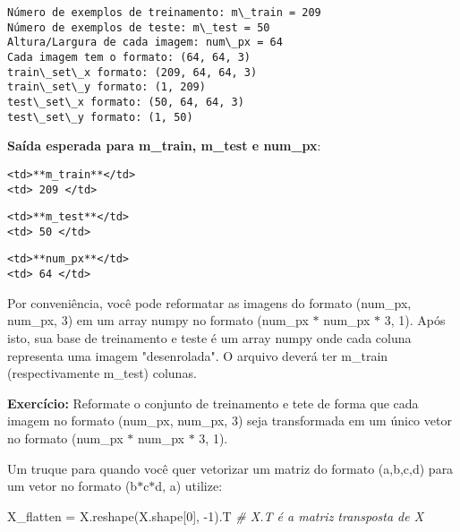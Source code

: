 \documentclass[11pt]{article}
\newenvironment{Shaded}{}{}
\newcommand{\DecValTok}[1]{\textcolor[rgb]{0.25,0.63,0.44}{{#1}}}
\newcommand{\CommentTok}[1]{\textcolor[rgb]{0.38,0.63,0.69}{\textit{{#1}}}}
\newcommand{\NormalTok}[1]{{#1}}
\newcommand{\OperatorTok}[1]{\textcolor[rgb]{0.40,0.40,0.40}{{#1}}}
\begin{document}
    \begin{Verbatim}[commandchars=\\\{\}]
Número de exemplos de treinamento: m\_train = 209
Número de exemplos de teste: m\_test = 50
Altura/Largura de cada imagem: num\_px = 64
Cada imagem tem o formato: (64, 64, 3)
train\_set\_x formato: (209, 64, 64, 3)
train\_set\_y formato: (1, 209)
test\_set\_x formato: (50, 64, 64, 3)
test\_set\_y formato: (1, 50)

    \end{Verbatim}

    \textbf{Saída esperada para m\_train, m\_test e num\_px}:

\begin{verbatim}
<td>**m_train**</td>
<td> 209 </td> 
\end{verbatim}

\begin{verbatim}
<td>**m_test**</td>
<td> 50 </td> 
\end{verbatim}

\begin{verbatim}
<td>**num_px**</td>
<td> 64 </td> 
\end{verbatim}

    Por conveniência, você pode reformatar as imagens do formato (num\_px,
num\_px, 3) em um array numpy no formato (num\_px \(*\) num\_px \(*\) 3,
1). Após isto, sua base de treinamento e teste é um array numpy onde
cada coluna representa uma imagem "desenrolada". O arquivo deverá ter
m\_train (respectivamente m\_test) colunas.

\textbf{Exercício:} Reformate o conjunto de treinamento e tete de forma
que cada imagem no formato (num\_px, num\_px, 3) seja transformada em um
único vetor no formato (num\_px \(*\) num\_px \(*\) 3, 1).

Um truque para quando você quer vetorizar um matriz do formato (a,b,c,d)
para um vetor no formato (b\(*\)c\(*\)d, a) utilize:

\begin{Shaded}
\begin{Highlighting}[]
\NormalTok{X_flatten }\OperatorTok{=}\NormalTok{ X.reshape(X.shape[}\DecValTok{0}\NormalTok{], }\OperatorTok{-}\DecValTok{1}\NormalTok{).T      }\CommentTok{# X.T é a matriz transposta de X}
\end{Highlighting}
\end{Shaded}
\end{document}

